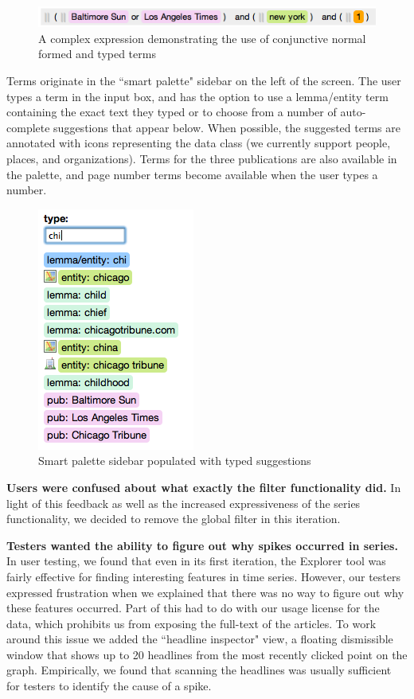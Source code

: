 \begin{figure}[htb]
  \centerline{
    \includegraphics[scale=0.28]{figures/builder-series.png}
  }
  \caption{A complex expression demonstrating the use of conjunctive normal formed and typed terms}
  \label{fig:builder-series}
\end{figure}


Terms originate in the ``smart palette" sidebar on the left of the screen. The user types a term in the input box, and has the option to use a lemma/entity term containing the exact text they typed or to choose from a number of auto-complete suggestions that appear below. When possible, the suggested terms are annotated with icons representing the data class (we currently support people, places, and organizations). Terms for the three publications are also available in the palette, and page number terms become available when the user types a number.

\begin{figure}[htb]
  \centerline{
    \includegraphics[scale=0.28]{figures/smart-palette.png}
  }
  \caption{Smart palette sidebar populated with typed suggestions}
  \label{fig:smart-palette}
\end{figure}


\textbf{Users were confused about what exactly the filter functionality did.} In light of this feedback as well as the increased expressiveness of the series functionality, we decided to remove the global filter in this iteration.

\textbf{Testers wanted the ability to figure out why spikes occurred in series.} In user testing, we found that even in its first iteration, the Explorer tool was fairly effective for finding interesting features in time series. However, our testers expressed frustration when we explained that there was no way to figure out why these features occurred. Part of this had to do with our usage license for the data, which prohibits us from exposing the full-text of the articles. To work around this issue we added the ``headline inspector" view, a floating dismissible window that shows up to 20 headlines from the most recently clicked point on the graph. Empirically, we found that scanning the headlines was usually sufficient for testers to identify the cause of a spike.


